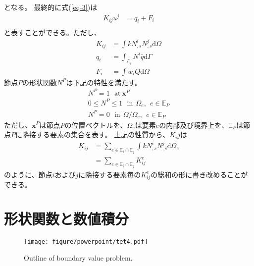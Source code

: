 \documentclass{jarticle}
\begin{document}
となる。
最終的に式(\ref{eq-3})は
\begin{align}
  K_{ij}u^j &= q_i + F_i\\
\end{align}
と表すことができる。ただし、
\begin{align}
  K_{ij} &= \int kN^i_{,s}N^j_{,s}\mathrm{d}\Omega\\
  q_i &= \int_{\Gamma_q} N^i\bar{q}\mathrm{d}\Gamma\\
  F_i &= \int w_i Q\mathrm{d}\Omega 
\end{align}
節点$P$の形状関数$N^P$は下記の特性を満たす。
\begin{align}
  N^P = 1  ~~~\mathrm{at} ~\bm{x}^P\\
  0\leq N^P \leq 1 ~~~\mathrm{in}~~\Omega_e, ~~e \in \mathbb{E}_P\\
  N^P=0 ~~~\mathrm{in}~~\Omega/\Omega_e, ~~e \in \mathbb{E}_P
\end{align}
ただし、$\bm{x}^P$は節点$P$の位置ベクトルを、$\Omega_e$は要素$e$の内部及び境界上を、$\mathbb{E}_P$は節点$P$に隣接する要素の集合を表す。
上記の性質から、$K_ij$は
\begin{align}
  K_{ij}
  &= \sum_{e \in \mathbb{E}_i\cap\mathbb{E}_j} \int kN^i_{,s}N^j_{,s}\mathrm{d}\Omega_e\\
  &= \sum_{e \in \mathbb{E}_i\cap\mathbb{E}_j} K^e_{ij}
\end{align}
のように、節点$i$および$j$に隣接する要素毎の$K^e_{ij}$の総和の形に書き改めることができる。
\section{形状関数と数値積分}
\begin{figure}[!th]
  \centering
  \texttt{[image: figure/powerpoint/tet4.pdf]}
  \caption{Outline of boundary value problem. }
  \end{figure}
\end{document}

